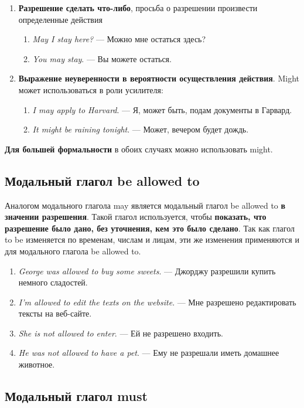 \documentclass{article}
\begin{document}
\begin{enumerate}
	\item \textbf{Разрешение сделать что-либо}, просьба о разрешении произвести определенные действия
	\begin{enumerate}
		\item \emph{May I stay here?} — Можно мне остаться здесь? 
		\item \emph{You may stay}. — Вы можете остаться. 
	\end{enumerate}
	\item \textbf{Выражение неуверенности в вероятности осуществления действия}. Might может использоваться в роли усилителя:
	\begin{enumerate}
		\item \emph{I may apply to Harvard}. — Я, может быть, подам документы в Гарвард.
		\item \emph{It might be raining tonight}. — Может, вечером будет дождь. 
	\end{enumerate}
\end{enumerate}

\textbf{Для большей формальности} в обоих случаях можно использовать might.

\subsection{Модальный глагол \textbf{be allowed to}}

Аналогом модального глагола may является модальный глагол be allowed to \textbf{в значении разрешения}. Такой глагол используется, чтобы \textbf{показать, что разрешение было дано, без уточнения, кем это было сделано}. Так как глагол to be изменяется по временам, числам и лицам, эти же изменения применяются и для модального глагола be allowed to.

\begin{enumerate}
	\item \emph{George was allowed to buy some sweets}. — Джорджу разрешили купить немного сладостей.
	\item \emph{I’m allowed to edit the texts on the website}. — Мне разрешено редактировать тексты на веб-сайте.
	\item \emph{She is not allowed to enter}. — Ей не разрешено входить.
	\item \emph{He was not allowed to have a pet}. — Ему не разрешали иметь домашнее животное. 
\end{enumerate}

\subsection{Модальный глагол \textbf{must}}
\end{document}
